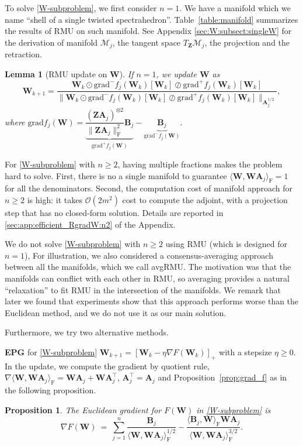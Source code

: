 \documentclass[sn-mathphys-num]{sn-jnl}
\def\grad            {\textrm{grad}}     %
\def\A {\bm{A}}
\def\B {\bm{B}}
\def\W {\bm{W}}
\def\Z {\bm{Z}}
\def\cM { \mathcal{M}}
\def\cO { \mathcal{O}}
\newtheorem{proposition}[theorem]{Proposition}
\newtheorem{lemma}[theorem]{Lemma}
\begin{document}
To solve \eqref{W-subproblem}, we first consider $n=1$.
We have a manifold which we name ``shell of a single twisted spectrahedron''.
Table~\ref{table:manifold} summarizes the results of RMU on such manifold.
See Appendix \ref{sec:W:subsect:singleW} for the derivation of manifold $\cM_j$, the tangent space $T_{\Z}\cM_j$, the projection and the retraction.






 

\begin{lemma}[RMU update on $\W$]\label{RMU_W_n1}
If $n=1$, we update $\W$  as 
\begin{equation}\label{updt:RMU_W_n1manifold}
\W_{k+1} =
\dfrac{\W_k \odot \grad^- f_j(\W_k)[\W_k] \oslash  \grad^+ f_j(\W_k)[\W_k]}{
\Big\| \W_k \odot \grad^- f_j(\W_k)[\W_k] \oslash  \grad^+ f_j(\W_k)[\W_k]\Big\|_{\A_j^{1/2}}
},
\end{equation}
where 
$
\grad f_j(\W) =
\underbrace{
\dfrac{(\Z\A_j)^{\otimes 2} }{\| \Z \A_j\|_\textrm{F}^2}  \B_j    
}_{\grad^+ f_j(\W)}
-
\underbrace{\B_j 
}_{\grad^- f_j(\W)}.
$
\end{lemma}


For \eqref{W-subproblem} with $n \geq 2$, having multiple fractions makes the problem hard to solve. 
First, there is no a single manifold to guarantee $\langle \W, \W \A_j \rangle_\textrm{F}=1$ for all the denominators.
Second, the computation cost of manifold approach for $n \geq 2$ is high: it takes $\cO(2m^2)$ cost to compute the adjoint, with a projection step that has no closed-form solution.
Details are reported in \textsection\ref{sec:app:efficient_RgradW:n2} of the Appendix.

We do not solve \eqref{W-subproblem} with $n\geq2$ using RMU (which is designed for $n=1$), For illustration, we also considered a consensus-averaging approach between all the manifolds, which we call avgRMU. 
The motivation was that the manifolds can conflict with each other in RMU, so averaging provides a natural ``relaxation'' to fit RMU in the intersection of the manifolds.
We remark that later we found that experiments show that this approach performs worse than the Euclidean method, and we do not use it as our main solution.

Furthermore, we try two alternative methods.

\noindent\textbf{EPG} for \eqref{W-subproblem}
$\W_{k+1} = [\W_k-\eta \nabla F(\W_k)]_+$ with a stepsize $\eta\geq 0$.
In the update, we compute the gradient by quotient rule, $\nabla \langle \W, \W \A_j   \rangle_\textrm{F} = \W \A_j + \W \A_j^\top$, $\A_j^\top = \A_j$ and  Proposition~\ref{prop:grad_f} as in the following proposition.
\begin{proposition}\label{prop:gradient_W}
The Euclidean gradient for $F(\W)$ in \eqref{W-subproblem} is
\begin{equation}\label{gradient_W}
\nabla F(\W) 
~=~
\sum_{j=1}^n
\dfrac{\B_j  }{\langle \W,  \W \A_j \rangle^{1/2}_\textrm{F}}
-
\dfrac{ \langle \B_j , \W \rangle_\textrm{F}   \W \A_j}{\langle \W,  \W \A_j  \rangle^{3/2}_\textrm{F}}
.
\end{equation}
\end{proposition}
\end{document}
